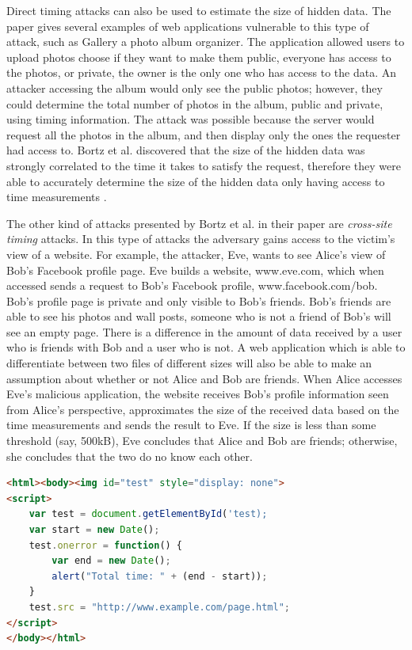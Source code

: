 \documentclass[10pt,a4paper,twoside]{book}
\begin{document}
Direct timing attacks can also be used to estimate the size of hidden data. The paper gives several examples of web applications vulnerable to this type of attack, such as Gallery a photo album organizer. The application allowed users to upload photos choose if they want to make them public, everyone has access to the photos, or private, the owner is the only one who has access to the data. An attacker accessing the album would only see the public photos; however, they could determine the total number of photos in the album, public and private, using timing information. The attack was possible because the server would request all the photos in the album, and then display only the ones the requester had access to. Bortz et al. discovered that the size of the hidden data was strongly correlated to the time it takes to satisfy the request, therefore they were able to accurately determine the size of the hidden data only having access to time measurements \cite{bortz2007exposing}. 

The other kind of attacks presented by Bortz et al. in their paper are \textit{cross-site timing} attacks. In this type of attacks the adversary gains access to the victim's view of a website. For example, the attacker, Eve, wants to see Alice's view of Bob's Facebook profile page. Eve builds a website, www.eve.com, which when accessed sends a request to Bob's Facebook profile, www.facebook.com/bob. Bob's profile page is private and only visible to Bob's friends. Bob's friends are able to see his photos and wall posts, someone who is not a friend of Bob's will see an empty page. There is a difference in the amount of data received by a user who is friends with Bob and a user who is not. A web application which is able to differentiate between two files of different sizes will also be able to make an assumption about whether or not Alice and Bob are friends. When Alice accesses Eve's malicious application, the website receives Bob's profile information seen from Alice's perspective, approximates the size of the received data based on the time measurements and sends the result to Eve. If the size is less than some threshold (say, 500kB), Eve concludes that Alice and Bob are friends; otherwise, she concludes that the two do no know each other.

\begin{lstlisting}[caption={Example JavaScript timing code},label={bortz}, language=HTML, showstringspaces=false]
<html><body><img id="test" style="display: none">
<script>
	var test = document.getElementById('test);
	var start = new Date();
	test.onerror = function() {
		var end = new Date();
		alert("Total time: " + (end - start));
	}
	test.src = "http://www.example.com/page.html";
</script>
</body></html>
\end{lstlisting}
\end{document}
